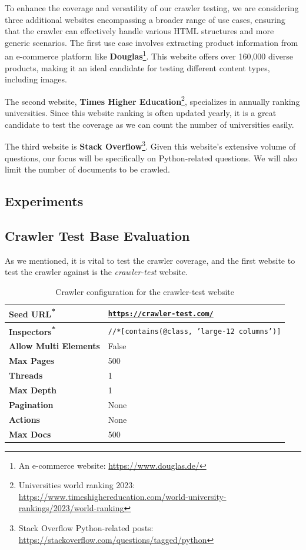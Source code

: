 {To enhance the coverage and versatility of our crawler testing, we are considering three additional websites encompassing a broader range of use cases, ensuring that the crawler can effectively handle various HTML structures and more generic scenarios.
The first use case involves extracting product information from an e-commerce platform like \textbf{Douglas}\footnote{An e-commerce website: \url{https://www.douglas.de/}}. This website offers over 160,000 diverse products, making it an ideal candidate for testing different content types, including images.

The second website, \textbf{Times Higher Education}\footnote{Universities world ranking 2023: \url{https://www.timeshighereducation.com/world-university-rankings/2023/world-ranking}}, specializes in annually ranking universities. Since this website ranking is often updated yearly, it is a great candidate to test the coverage as we can count the number of universities easily.

The third website is \textbf{Stack Overflow}\footnote{Stack Overflow Python-related posts: \url{https://stackoverflow.com/questions/tagged/python}}. Given this website's extensive volume of questions, our focus will be specifically on Python-related questions. We will also limit the number of documents to be crawled.

\subsection{Experiments}
\subsection*{Crawler Test Base Evaluation}
As we mentioned, it is vital to test the crawler coverage, and the first website to test the crawler against is the \textit{crawler-test} website. 


\begin{table}[ht] 
\centering
{\footnotesize
\begin{tabular}{ |P{2.5cm}|P{8cm}|  }
 \hline
    \textbf{Seed URL\textsuperscript{*}} & \href{https://crawler-test.com/}{\texttt{https://crawler-test.com/}}\\ \hline
        \textbf{Inspectors\textsuperscript{*}} & \texttt{//*[contains(@class, 'large-12 columns')]}\\ \hline\hline
    \textbf{Allow Multi Elements} & False  \\ \hline
    \textbf{Max Pages} & 500\\ \hline
    \textbf{Threads} & 1\\ \hline
    \textbf{Max Depth} & 1 \\ \hline
    \textbf{Pagination} & None \\ \hline
    \textbf{Actions} & None\\ \hline
    \textbf{Max Docs} & 500\\ 
\hline
    \end{tabular}
}
  \captionsetup{justification=centering,margin=2cm}
  \caption{Crawler configuration for the crawler-test website}
  \label{table:crawler_test_config}
\end{table}

}
